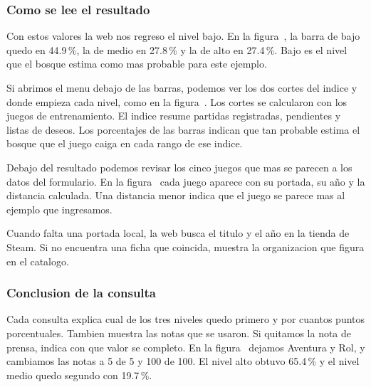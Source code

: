
\subsubsection{Como se lee el resultado}
Con estos valores la web nos regreso el nivel bajo. En la figura~, la barra de bajo quedo en 44.9\,\%, la de medio en 27.8\,\% y la de alto en 27.4\,\%. Bajo es el nivel que el bosque estima como mas probable para este ejemplo.

Si abrimos el menu debajo de las barras, podemos ver los dos cortes del indice y donde empieza cada nivel, como en la figura~. Los cortes se calcularon con los juegos de entrenamiento. El indice resume partidas registradas, pendientes y listas de deseos. Los porcentajes de las barras indican que tan probable estima el bosque que el juego caiga en cada rango de ese indice.


Debajo del resultado podemos revisar los cinco juegos que mas se parecen a los datos del formulario. En la figura~ cada juego aparece con su portada, su año y la distancia calculada. Una distancia menor indica que el juego se parece mas al ejemplo que ingresamos.


Cuando falta una portada local, la web busca el titulo y el año en la tienda de Steam. Si no encuentra una ficha que coincida, muestra la organizacion que figura en el catalogo.

\subsubsection*{Conclusion de la consulta}
Cada consulta explica cual de los tres niveles quedo primero y por cuantos puntos porcentuales. Tambien muestra las notas que se usaron. Si quitamos la nota de prensa, indica con que valor se completo. En la figura~ dejamos Aventura y Rol, y cambiamos las notas a 5 de 5 y 100 de 100. El nivel alto obtuvo 65.4\,\% y el nivel medio quedo segundo con 19.7\,\%.

